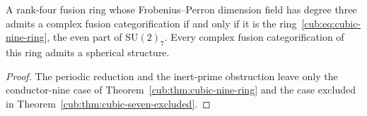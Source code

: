 \begin{theorem}\label{cub:thm:cubic-classification}
A rank-four fusion ring whose Frobenius--Perron dimension
field has degree three admits a complex fusion categorification if and only
if it is the ring~\eqref{cub:eq:cubic-nine-ring}, the even part of
$\mathrm{SU}(2)_7$. Every complex fusion categorification of this ring
admits a spherical structure.
\end{theorem}
\begin{proof}
The periodic reduction and the inert-prime obstruction leave only the
conductor-nine case of Theorem~\ref{cub:thm:cubic-nine-ring} and the case
excluded in Theorem~\ref{cub:thm:cubic-seven-excluded}.
\end{proof}



